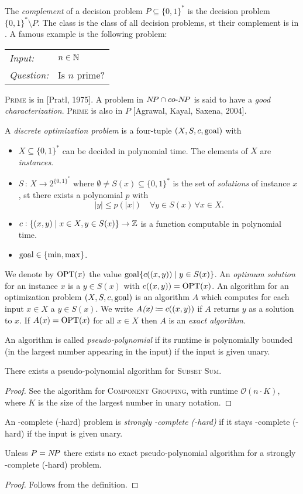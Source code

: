 \documentclass[../skript.tex]{subfiles}
\begin{document}
The \emph{complement} of a decision problem $P \subseteq \{ 0, 1\}^*$ is the decision problem $\{ 0, 1\}^* \setminus P$.
The class \coNP is the class of all decision problems, \ac{st} their complement is in \NP.
A famous example is the following problem:
\begin{problem}[Prime]
\begin{tabular}{@{}ll}
\textit{Input:} & $n \in \mathbb{N}$ \\
\textit{Question:} & Is $n$ prime?
\end{tabular}
\end{problem}
\textsc{Prime} is in \NP{} [Pratl, 1975].
A problem in $N \! P \cap co\text{-}N \! P$ is said to have a \emph{good characterization}.
\textsc{Prime} is also in $P$ [Agrawal, Kayal, Saxena, 2004].

A \emph{discrete optimization problem} is a four-tuple $(X, S, c, \operatorname{goal})$ with
\begin{itemize}
\item $X \subseteq \{ 0, 1\}^*$ can be decided in polynomial time. The elements of $X$ are \emph{instances}.
\item $S \, : \, X \to 2^{\{ 0, 1\}^*}$ where $\emptyset \neq S(x) \subseteq \{ 0, 1\}^*$ is the set of \emph{solutions} of instance $x$, \ac{st} there exists a polynomial $p$ with
\[
	|y| \leq p(|x|) \quad \forall y \in S(x) \, \forall x \in X.
\]
\item $c : \{ (x, y) \mid x \in X, y \in S(x)\} \to \mathbb{Z}$ is a function computable in polynomial time.
\item $\operatorname{goal} \in \{ \min, \max \}$.
\end{itemize}
We denote by \emph{$\operatorname{OPT}(x)$} the value $\operatorname{goal} \{ c((x, y)) \mid y \in S(x) \}$.
An \emph{optimum solution} for an instance $x$ is a $y \in S(x)$ with $c((x, y)) = \operatorname{OPT}(x)$. An algorithm for an optimization problem $(X, S, c, \operatorname{goal})$ is an algorithm $A$ which computes for each input $x \in X$ a $y\in S(x)$.
We write $\emph{A(x)} \coloneqq c((x, y))$ if $A$ returns $y$ as a solution to $x$.
If $A(x) = \operatorname{OPT}(x)$ for all $x \in X$ then $A$ is an \emph{exact algorithm}.

An algorithm is called \emph{pseudo-polynomial} if its runtime is polynomially bounded (in the largest number appearing in the input) if the input is given unary.
\begin{theorem} %
\label{thm:19}
There exists a pseudo-polynomial algorithm for \textsc{Subset Sum}.
\end{theorem}
\begin{proof}
See the algorithm for \textsc{Component Grouping}, with runtime $\mathcal{O}(n \cdot K)$, where $K$ is the size of the largest number in unary notation.
\end{proof}
An \NP-complete (\NP-hard) problem is \emph{strongly \NP-complete (\NP-hard)} if it stays \NP-complete (\NP-hard) if the input is given unary.
\begin{theorem} %
\label{thm:20}
Unless $P = N \! P$ there exists no exact pseudo-polynomial algorithm for a strongly \NP-complete (\NP-hard) problem.
\end{theorem}
\begin{proof}
Follows from the definition.
\end{proof}
\end{document}
